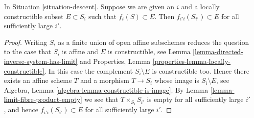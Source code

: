 \begin{lemma}
\label{lemma-limit-contained-in-constructible}
In Situation \ref{situation-descent}.
Suppose we are given an $i$ and a locally constructible subset
$E \subset S_i$ such that $f_i(S) \subset E$.
Then $f_{i'i}(S_{i'}) \subset E$ for all sufficiently large $i'$.
\end{lemma}

\begin{proof}
Writing $S_i$ as a finite union of open affine subschemes reduces
the question to the case that $S_i$ is affine and $E$ is constructible, see
Lemma \ref{lemma-directed-inverse-system-has-limit}
and
Properties, Lemma \ref{properties-lemma-locally-constructible}.
In this case the complement $S_i \setminus E$ is constructible too.
Hence there exists an affine scheme $T$ and a morphism $T \to S_i$
whose image is $S_i \setminus E$, see
Algebra, Lemma \ref{algebra-lemma-constructible-is-image}.
By
Lemma \ref{lemma-limit-fibre-product-empty}
we see that $T \times_{S_i} S_{i'}$ is empty for all sufficiently large
$i'$, and hence $f_{i'i}(S_{i'}) \subset E$ for all sufficiently large $i'$.
\end{proof}
